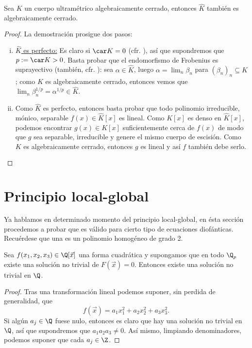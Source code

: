 \documentclass[teoria-numeros.tex]{subfiles}
\begin{document}
\begin{thm}\label{thm:compl_algcl_is_complete}
	Sea $K$ un cuerpo ultramétrico algebraicamente cerrado, entonces $\hat K$ también es algebraicamente cerrado.
\end{thm}
\begin{proof}
	La demostración prosigue dos pasos:
	\begin{enumerate}[(i)]
		\item \underline{$\hat K$ es perfecto:}
			Es claro si $\car K = 0$ (cfr. \cite[teo.~4.34]{Alg}), así que supondremos que $p := \car K > 0$.
			Basta probar que el endomorfismo de Frobenius es suprayectivo (también, cfr. \cite[teo.~4.34]{Alg}):
			sea $\alpha \in \hat K$, luego $\alpha = \lim_n \beta_n$ para $(\beta_n)_n \subseteq K$;
			como $K$ es algebraicamente cerrado, entonces vemos que $\lim_n \beta_n^{1/p} = \alpha^{1/p} \in \hat K$.

		\item Como $\hat K$ es perfecto, entonces basta probar que todo polinomio irreducible, mónico, separable $f(x) \in \hat K[x]$ es lineal.
			Como $K[x]$ es denso en $\hat K[x]$, podemos encontrar $g(x) \in K[x]$ suficientemente cerca de $f(x)$ de modo que $g$
			sea separable, irreducible y genere el mismo cuerpo de escisión.
			Como $K$ es algebraicamente cerrado, entonces $g$ es lineal y así $f$ también debe serlo. \qedhere
	\end{enumerate}
\end{proof}

\section{Principio local-global}
Ya hablamos en determinado momento del principio local-global,
en ésta sección procedemos a probar que es válido para cierto tipo de ecuaciones diofánticas.
Recuérdese que una  es un polinomio homogéneo de grado 2.

\begin{thm}
	Sea $f(x_1, x_2, x_3) \in \Q[\vec x]$ una forma cuadrática y supongamos que en todo $\Q_p$ existe una solución no trivial de $F(\vec x) = 0$.
	Entonces existe una solución no trivial en $\Q$.
\end{thm}
\begin{proof}
	Tras una transformación lineal podemos suponer, sin perdida de generalidad, que
	\[
		f(\vec x) = a_1x_1^2 + a_2x_2^2 + a_3x_3^2.
	\]
	Si algún $a_j \in \Q$ fuese nulo, entonces es claro que hay una solución no trivial en $\Q$, así que supondremos que $a_1a_2a_3 \ne 0$.
	Así mismo, limpiando denominadores, podemos suponer que cada $a_j \in \Z$.
\end{proof}
\end{document}
